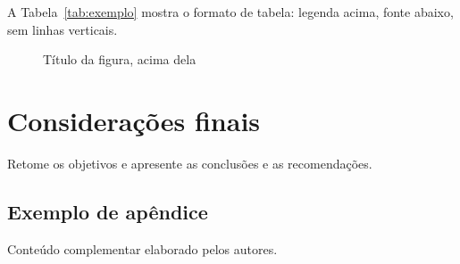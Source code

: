 \documentclass[12pt,a4paper,oneside,english,brazil]{abntex2}
\begin{document}
A Tabela~\ref{tab:exemplo} mostra o formato de tabela: legenda acima, fonte abaixo, sem linhas verticais.

\begin{figure}[htb]
  \caption{Título da figura, acima dela}\label{fig:exemplo}
  \centering
\end{figure}

\chapter{Considerações finais}
Retome os objetivos e apresente as conclusões e as recomendações.

\postextual

\begin{apendicesenv}                       %
\partapendices
\chapter{Exemplo de apêndice}
Conteúdo complementar elaborado pelos autores.
\end{apendicesenv}


\end{document}
